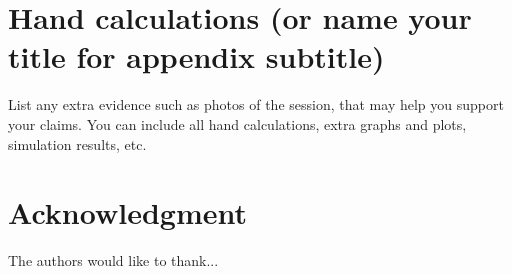 \documentclass[journal]{IEEEtran}
\begin{document}

%


\appendices
\section{Hand calculations (or name your title for appendix subtitle)}
List any extra evidence such as photos of the session, that may help you support your claims.
You can include all hand calculations, extra graphs and plots, simulation results, etc. 

\section*{Acknowledgment}
The authors would like to thank...




%
%
%
\end{document}

